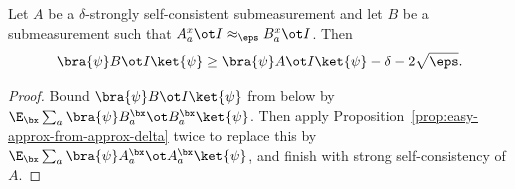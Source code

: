 \begin{lemma}\label{prop:completeness-transfer-self-consistent-A}
	\leanok
	Let $A$ be a $\delta$-strongly self-consistent submeasurement and let $B$ be a submeasurement such that $A_a^x \ot I \approx_\eps B_a^x \ot I$. Then
	\[
		\bra{\psi} B \ot I \ket{\psi} \ge \bra{\psi} A \ot I \ket{\psi} - \delta - 2\sqrt\eps.
	\]
\end{lemma}
\begin{proof}
	\leanok
	Bound $\bra{\psi} B \ot I \ket{\psi}$ from below by $\E_{\bx}\sum_a \bra{\psi} B^\bx_a \ot B^\bx_a \ket{\psi}$. Then apply Proposition~\ref{prop:easy-approx-from-approx-delta} twice to replace this by $\E_{\bx}\sum_a \bra{\psi} A^\bx_a \ot A^\bx_a \ket{\psi}$, and finish with strong self-consistency of $A$.
\end{proof}

